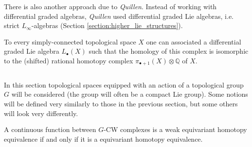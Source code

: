     There is also another approach due to \textit{Quillen}. Instead of working with differential graded algebras, \textit{Quillen} used differential graded Lie algebras, i.e. strict $L_\infty$-algebras (Section \ref{section:higher_lie_structures}).
    \begin{construct}
        To every simply-connected topological space $X$ one can associated a differential graded Lie algebra $L_\bullet(X)$ such that the homology of this complex is isomorphic to the (shifted) rational homotopy complex $\pi_{\bullet+1}(X)\otimes\mathbb{Q}$ of $X$.
    \end{construct}

\subsection{}

    In this section topological spaces equipped with an action of a topological group $G$ will be considered (the group will often be a compact Lie group). Some notions will be defined very similarly to those in the previous section, but some others will look very differently.



    \begin{theorem}
        A continuous function between $G$-CW complexes is a weak equivariant homotopy equivalence if and only if it is a equivariant homotopy equivalence.
    \end{theorem}

